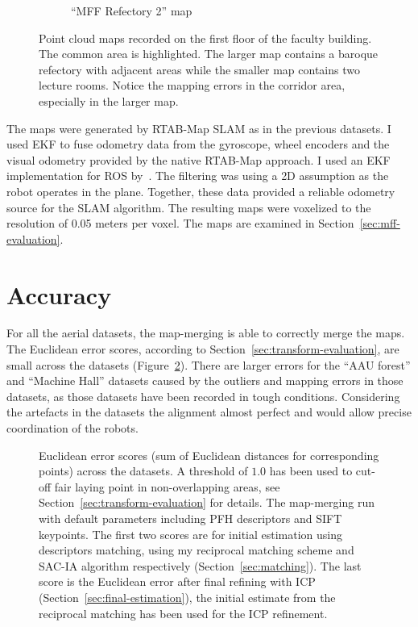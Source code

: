 \begin{figure}
\begin{subfigure}[b]{\textwidth}
        \caption{``MFF Refectory 2'' map}
    \end{subfigure}
    \caption[MFF Refectory maps]{Point cloud maps recorded on the first floor of the faculty building. The common area is highlighted. The larger map contains a baroque refectory with adjacent areas while the smaller map contains two lecture rooms. Notice the mapping errors in the corridor area, especially in the larger map.}
    \label{fig:mff_refectory}
\end{figure}


The maps were generated by RTAB-Map \gls{SLAM} as in the previous datasets. I used \gls{EKF} to fuse odometry data from the gyroscope, wheel encoders and the visual odometry provided by the native RTAB-Map approach. I used an \gls{EKF} implementation for \gls{ROS} by~\citet{moore2016ekf}. The filtering was using a \gls{2D} assumption as the robot operates in the plane. Together, these data provided a reliable odometry source for the \gls{SLAM} algorithm. The resulting maps were voxelized to the resolution of 0.05 meters per voxel. The maps are examined in Section~\ref{sec:mff-evaluation}.

\section{Accuracy}

For all the aerial datasets, the map-merging is able to correctly merge the maps. The Euclidean error scores, according to Section~\ref{sec:transform-evaluation}, are small across the datasets (Figure~\ref{fig:plot:euc_dist}). There are larger errors for the ``AAU forest'' and ``Machine Hall'' datasets caused by the outliers and mapping errors in those datasets, as those datasets have been recorded in tough conditions. Considering the artefacts in the datasets the alignment almost perfect and would allow precise coordination of the robots.

\begin{figure}
  \centering
  
  \caption[Euclidean error scores for aerial datasets]{Euclidean error scores (sum of Euclidean distances for corresponding points) across the datasets. A threshold of $1.0$ has been used to cut-off fair laying point in non-overlapping areas, see Section~\ref{sec:transform-evaluation} for details. The map-merging run with default parameters including \gls{PFH} descriptors and \gls{SIFT} keypoints. The first two scores are for initial estimation using descriptors matching, using my reciprocal matching scheme and \gls{SAC-IA} algorithm respectively (Section~\ref{sec:matching}). The last score is the Euclidean error after final refining with \gls{ICP} (Section~\ref{sec:final-estimation}), the initial estimate from the reciprocal matching has been used for the \gls{ICP} refinement.}
  \label{fig:plot:euc_dist}
\end{figure}

